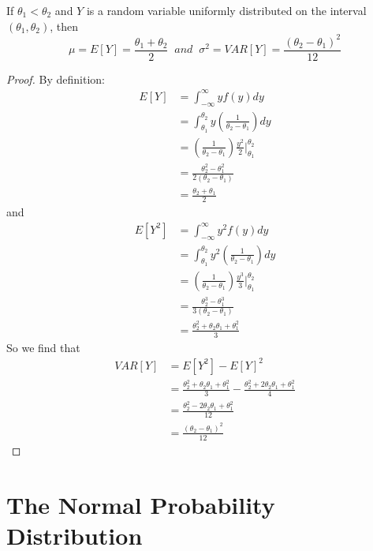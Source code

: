 \documentclass[12pt, a4paper, twoside, openright, titlepage]{book}
\begin{document}
\begin{thm}{}{}
    If $\theta_1 < \theta_2$ and $Y$ is a random variable uniformly distributed on the interval $(\theta_1,\theta_2)$, then \begin{equation*}
        \mu = E[Y] = \frac{\theta_1+\theta_2}{2}\;\;and\;\;\sigma^2 = VAR[Y] = \frac{(\theta_2-\theta_1)^2}{12}
    \end{equation*}
\end{thm}
\begin{proof}{}{}
    By definition: \begin{align*}
        E[Y] &= \int_{-\infty}^{\infty}yf(y)dy \\
        &= \int_{\theta_1}^{\theta_2}y\left(\frac{1}{\theta_2-\theta_1}\right)dy \\
        &= \left(\frac{1}{\theta_2-\theta_1}\right)\frac{y^2}{2}\Bigg\rvert_{\theta_1}^{\theta_2} \\
        &= \frac{\theta_2^2 - \theta_1^2}{2(\theta_2-\theta_1)} \\
        &= \frac{\theta_2+\theta_1}{2}
    \end{align*}
    and \begin{align*}
        E[Y^2] &= \int_{-\infty}^{\infty}y^2f(y)dy \\
        &= \int_{\theta_1}^{\theta_2}y^2\left(\frac{1}{\theta_2-\theta_1}\right)dy \\
        &= \left(\frac{1}{\theta_2-\theta_1}\right)\frac{y^3}{3}\Bigg\rvert_{\theta_1}^{\theta_2} \\
        &= \frac{\theta_2^3 - \theta_1^3}{3(\theta_2-\theta_1)} \\
        &= \frac{\theta_2^2+\theta_2\theta_1+\theta_1^2}{3}
    \end{align*}
    So we find that \begin{align*}
        VAR[Y] &= E[Y^2] - E[Y]^2 \\
        &= \frac{\theta_2^2+\theta_2\theta_1+\theta_1^2}{3} - \frac{\theta_2^2+2\theta_2\theta_1+\theta_1^2}{4} \\
        &= \frac{\theta_2^2-2\theta_2\theta_1+\theta_1^2}{12} \\
        &= \frac{(\theta_2-\theta_1)^2}{12}
    \end{align*}
\end{proof}

\section{\textsection The Normal Probability Distribution}
\end{document}
